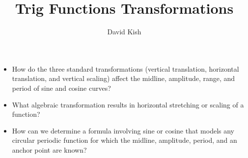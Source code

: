 \documentclass{ximera}
\author{David Kish}
\title{Trig Functions Transformations}
\begin{document}
\begin{abstract}
  
\end{abstract}
\maketitle

%
%
%


%
\begin{motivatingQuestions}
\begin{itemize}[label=\textbullet]
\item{}
How do the three standard transformations (vertical translation, horizontal translation, and vertical scaling) affect the midline, amplitude, range, and period of sine and cosine curves?%
\item{}
What algebraic transformation results in horizontal stretching or scaling of a function?%
\item{}
How can we determine a formula involving sine or cosine that models any circular periodic function for which the midline, amplitude, period, and an anchor point are known?%
\end{itemize}
\end{motivatingQuestions}
\end{document}
